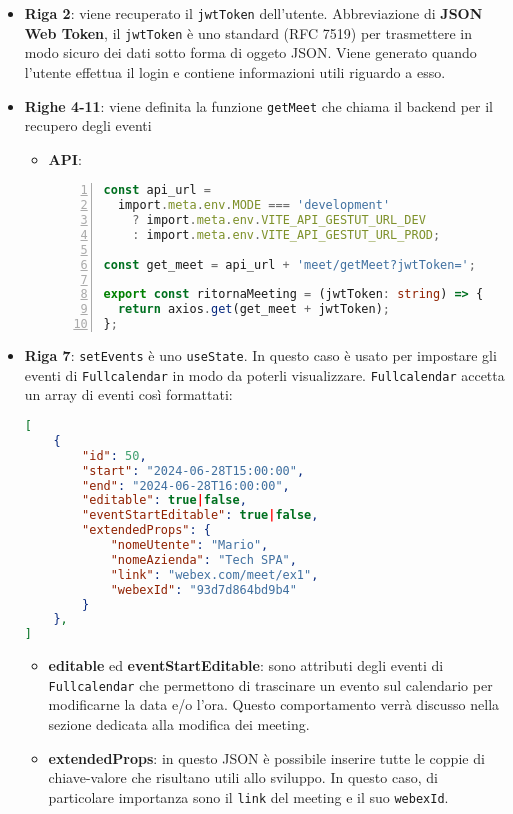 \begin{itemize}
    \item \textbf{Riga 2}: viene recuperato il \texttt{jwtToken} dell'utente. Abbreviazione di \textbf{JSON Web Token}, 
    il \texttt{jwtToken} è uno standard (RFC 7519) per trasmettere in modo sicuro dei dati sotto forma di oggeto JSON. \cite{jwtToken}
    Viene generato quando l'utente effettua il login e contiene informazioni utili riguardo a esso.
    \item \textbf{Righe 4-11}: viene definita la funzione \texttt{getMeet} che chiama il backend per il recupero degli eventi 
        \begin{itemize}
            \item \textbf{API}:
            \begin{lstlisting}[language=typescript, frame=lines, basicstyle=\ttfamily\scriptsize, numbers=left]
const api_url =
  import.meta.env.MODE === 'development'
    ? import.meta.env.VITE_API_GESTUT_URL_DEV
    : import.meta.env.VITE_API_GESTUT_URL_PROD;

const get_meet = api_url + 'meet/getMeet?jwtToken=';

export const ritornaMeeting = (jwtToken: string) => {
  return axios.get(get_meet + jwtToken);
};

            \end{lstlisting}
        \end{itemize}

    \item \textbf{Riga 7}: \texttt{setEvents} è uno \texttt{useState}.  In questo caso è usato per impostare gli eventi 
    di \texttt{Fullcalendar} in modo da poterli visualizzare. \texttt{Fullcalendar} accetta un array di eventi così formattati:
\begin{lstlisting}[language=json,firstnumber=1]
[
    {
        "id": 50,
        "start": "2024-06-28T15:00:00",
        "end": "2024-06-28T16:00:00",
        "editable": true|false,
        "eventStartEditable": true|false,
        "extendedProps": {
            "nomeUtente": "Mario",
            "nomeAzienda": "Tech SPA",
            "link": "webex.com/meet/ex1",
            "webexId": "93d7d864bd9b4"
        }
    },                   
]               
\end{lstlisting}
    \begin{itemize}
        \item \textbf{editable} ed \textbf{eventStartEditable}: sono attributi degli eventi di \texttt{Fullcalendar}
        che permettono di trascinare un evento sul calendario per modificarne la data e/o l'ora. Questo comportamento verrà
        discusso nella sezione dedicata alla modifica dei meeting.
        \item \textbf{extendedProps}: in questo JSON è possibile inserire tutte le coppie di chiave-valore che risultano
        utili allo sviluppo. In questo caso, di particolare importanza sono il \texttt{link} del meeting e il suo \texttt{webexId}.
    \end{itemize}


\end{itemize}
